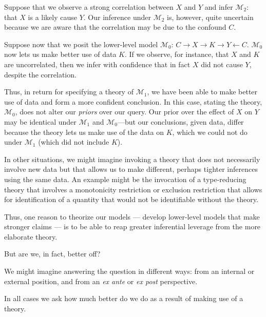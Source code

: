 \documentclass[
  12pt,
]{book}
\begin{document}
Suppose that we observe a strong correlation between \(X\) and \(Y\) and infer \(\mathcal M_2\): that \(X\) is a likely cause \(Y\). Our inference under \(\mathcal M_2\) is, however, quite uncertain because we are aware that the correlation may be due to the confound \(C\).

Suppose now that we posit the lower-level model \(\mathcal M_0\): \(C \rightarrow X \rightarrow K \rightarrow Y \leftarrow C\). \(\mathcal M_0\) now lets us make better use of data \(K\). If we observe, for instance, that \(X\) and \(K\) are uncorrelated, then we infer with confidence that in fact \(X\) did not cause \(Y\), despite the correlation.

Thus, in return for specifying a theory of \(\mathcal M_1\), we have been able to make better use of data and form a more confident conclusion. In this case, stating the theory, \(\mathcal M_0\), does not alter our \emph{priors} over our query. Our prior over the effect of \(X\) on \(Y\) may be identical under \(\mathcal M_1\) and \(\mathcal M_0\)---but our conclusions, given data, differ because the theory lets us make use of the data on \(K\), which we could not do under \(\mathcal M_1\) (which did not include \(K\)).

In other situations, we might imagine invoking a theory that does not necessarily involve new data but that allows us to make different, perhaps tighter inferences using the same data. An example might be the invocation of a type-reducing theory that involves a monotonicity restriction or exclusion restriction that allows for identification of a quantity that would not be identifiable without the theory.

Thus, one reason to theorize our models --- develop lower-level models that make stronger claims --- is to be able to reap greater inferential leverage from the more elaborate theory.

But are we, in fact, better off?

We might imagine answering the question in different ways: from an internal or external position, and from an \emph{ex ante} or \emph{ex post} perspective.

In all cases we ask how much better do we do as a result of making use of a theory.
\end{document}
